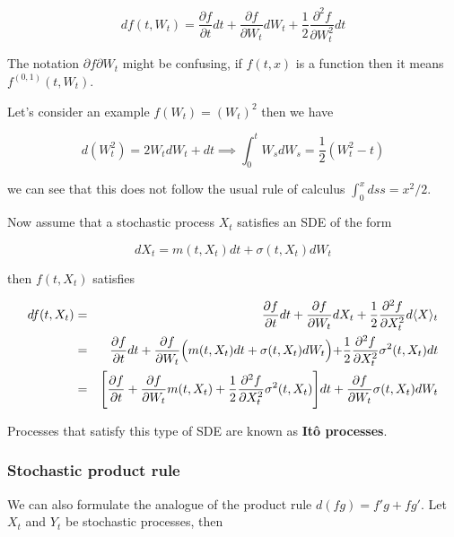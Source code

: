 \documentclass[11pt,a4paper]{article}
\begin{document}
\begin{equation}
    df(t,W_t) = \frac{\partial f}{\partial t} dt + \frac{\partial f}{\partial W_t} dW_t + \frac{1}{2}\frac{\partial^2 f}{\partial W_t^2} dt
\end{equation}

The notation ${\partial f}{\partial W_t}$ might be confusing, if $f(t,x)$ is a function then it means $f^{(0,1)}(t,W_t)$.

Let's consider an example $f(W_t) = (W_t)^2$ then we have

\begin{equation}
    d(W^2_t) = 2W_t dW_t + dt \implies \int_{0}^{t} W_s dW_s = \frac{1}{2}(W^2_t-t)
\end{equation}

we can see that this does not follow the usual rule of calculus $\int_{0}^{x} ds s = x^2/2$.



Now assume that a stochastic process $X_t$ satisfies an SDE of the form

\begin{equation}
dX_t = m(t,X_t)dt + \sigma(t,X_t)dW_t    
\end{equation}

then $f(t,X_t)$ satisfies

\begin{eqnarray}
    df(t,X_t) &=&   \frac{\partial f}{\partial t} dt + \frac{\partial f}{\partial W_t} dX_t + \frac{1}{2}\frac{\partial^2 f}{\partial X_t^2} d\langle X\rangle_t \nonumber \\
    &=& \frac{\partial f}{\partial t} dt + \frac{\partial f}{\partial W_t}\Bigl( m(t,X_t)dt + \sigma(t,X_t)dW_t \Bigl) + \frac{1}{2}\frac{\partial^2 f}{\partial X_t^2} \sigma^2(t,X_t)dt \nonumber \\
    &=& \Biggl[\frac{\partial f}{\partial t} +\frac{\partial f}{\partial W_t} m(t,X_t) + \frac{1}{2}\frac{\partial^2 f}{\partial X_t^2} \sigma^2(t,X_t)\Biggl]dt + \frac{\partial f}{\partial W_t}\sigma(t,X_t)dW_t
\end{eqnarray}

Processes that satisfy this type of SDE are known as \textbf{It\^{o} processes}.

\subsubsection{Stochastic product rule}
We can also formulate the analogue of the product rule $d(fg) = f'g+fg'$. Let $X_t$ and $Y_t$ be stochastic processes, then
\end{document}
